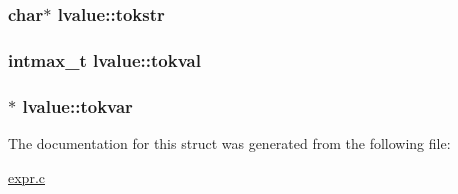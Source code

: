 \subsubsection[{\texorpdfstring{tokstr}{tokstr}}]{\setlength{\rightskip}{0pt plus 5cm}char$\ast$ lvalue\+::tokstr}\hypertarget{structlvalue_a69733836b6e89608c3b7f52575f168b6}{}\label{structlvalue_a69733836b6e89608c3b7f52575f168b6}
\subsubsection[{\texorpdfstring{tokval}{tokval}}]{\setlength{\rightskip}{0pt plus 5cm}intmax\+\_\+t lvalue\+::tokval}\hypertarget{structlvalue_a586486707a36587077d5c14c477e8a2a}{}\label{structlvalue_a586486707a36587077d5c14c477e8a2a}
\subsubsection[{\texorpdfstring{tokvar}{tokvar}}]{$\ast$ lvalue\+::tokvar}\hypertarget{structlvalue_a6875190861863191326371f28d09a933}{}\label{structlvalue_a6875190861863191326371f28d09a933}


The documentation for this struct was generated from the following file\+:\begin{DoxyCompactItemize}
\item 
\hyperlink{expr_8c}{expr.\+c}\end{DoxyCompactItemize}
